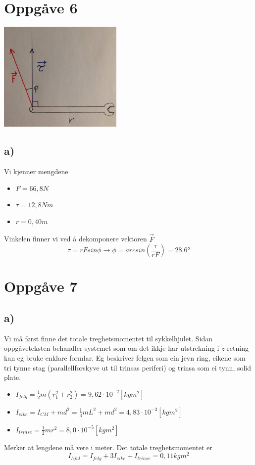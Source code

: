 \documentclass[12pt,a4paper]{article}
\begin{document}
  \section*{Oppgåve 6}
    \begin{center}
      \includegraphics[width=60mm]{04_06}
    \end{center}
    \subsection*{a)}

    Vi kjenner mengdene
    \begin{itemize}
      \item $F = 66,8N$
      \item $\tau = 12,8Nm$
      \item $r = 0,40m$
    \end{itemize}
    Vinkelen finner vi ved å dekomponere vektoren $\vec{F}$
    \begin{equation}
      \tau = rFsin\phi \rightarrow \phi = arcsin \left( \frac{\tau}{rF} \right) = \ang{28,6}
    \end{equation}

  \section*{Oppgåve 7}
    \subsection*{a)}
    Vi må først finne det totale treghetsmomentet til sykkelhjulet. Sidan oppgåveteksten
    behandler systemet som om det ikkje har utstrekning i $z$-retning kan eg bruke
    enklare formlar. Eg beskriver felgen som ein jevn ring, eikene som tri tynne stag
    (parallellforskyve ut til trinsas periferi) og trinsa som ei tynn, solid plate.
    \begin{itemize}
      \item $I_{felg} =\frac{1}{2}m(r_1^2+r_2^2) = 9,62\cdot 10^{-2}[kgm^2]$
      \item $I_{eike} =I_{CM}+md^2 = \frac{1}{3}mL^2 + md^2 = 4,83 \cdot10^{-3}[kgm^2]$
      \item $I_{trinse} =\frac{1}{2}mr^2 = 8,0\cdot10^{-5}[kgm^2]$
    \end{itemize}
    Merker at lengdene må vere i meter. Det totale treghetsmomentet er
    \begin{equation}
      I_{hjul} = I_{felg} + 3I_{eike} + I_{trinse} = 0,11kgm^2
    \end{equation}
\end{document}
